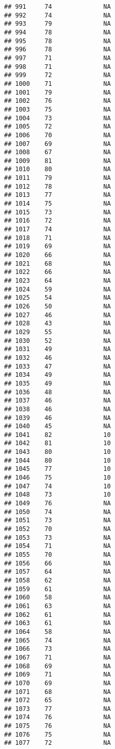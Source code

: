\documentclass[]{article}
\begin{document}
\begin{verbatim}
## 991     74              NA
## 992     74              NA
## 993     79              NA
## 994     78              NA
## 995     78              NA
## 996     78              NA
## 997     71              NA
## 998     71              NA
## 999     72              NA
## 1000    71              NA
## 1001    79              NA
## 1002    76              NA
## 1003    75              NA
## 1004    73              NA
## 1005    72              NA
## 1006    70              NA
## 1007    69              NA
## 1008    67              NA
## 1009    81              NA
## 1010    80              NA
## 1011    79              NA
## 1012    78              NA
## 1013    77              NA
## 1014    75              NA
## 1015    73              NA
## 1016    72              NA
## 1017    74              NA
## 1018    71              NA
## 1019    69              NA
## 1020    66              NA
## 1021    68              NA
## 1022    66              NA
## 1023    64              NA
## 1024    59              NA
## 1025    54              NA
## 1026    50              NA
## 1027    46              NA
## 1028    43              NA
## 1029    55              NA
## 1030    52              NA
## 1031    49              NA
## 1032    46              NA
## 1033    47              NA
## 1034    49              NA
## 1035    49              NA
## 1036    48              NA
## 1037    46              NA
## 1038    46              NA
## 1039    46              NA
## 1040    45              NA
## 1041    82              10
## 1042    81              10
## 1043    80              10
## 1044    80              10
## 1045    77              10
## 1046    75              10
## 1047    74              10
## 1048    73              10
## 1049    76              NA
## 1050    74              NA
## 1051    73              NA
## 1052    70              NA
## 1053    73              NA
## 1054    71              NA
## 1055    70              NA
## 1056    66              NA
## 1057    64              NA
## 1058    62              NA
## 1059    61              NA
## 1060    58              NA
## 1061    63              NA
## 1062    61              NA
## 1063    61              NA
## 1064    58              NA
## 1065    74              NA
## 1066    73              NA
## 1067    71              NA
## 1068    69              NA
## 1069    71              NA
## 1070    69              NA
## 1071    68              NA
## 1072    65              NA
## 1073    77              NA
## 1074    76              NA
## 1075    76              NA
## 1076    75              NA
## 1077    72              NA

\end{verbatim}
\end{document}
